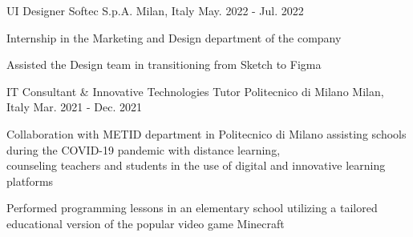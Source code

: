 \begin{cventries}
    \cventry
      {UI Designer} %
      {Softec S.p.A.} %
      {Milan, Italy} %
      {May. 2022 - Jul. 2022} %
      {
        \begin{cvitems} %
          {Internship in the Marketing and Design department of the company}
          \item {}
          \item {Assisted the Design team in transitioning from Sketch to Figma}
        \end{cvitems}
      }
  
    \cventry
      {IT Consultant \& Innovative Technologies Tutor} %
      {Politecnico di Milano} %
      {Milan, Italy} %
      {Mar. 2021 - Dec. 2021} %
      {
        \begin{cvitems} %
          {Collaboration with METID department in Politecnico di Milano assisting schools during the COVID-19 pandemic with distance learning, \\counseling teachers and students in the use of digital and innovative learning platforms}
          \item {}
          \item {Performed programming lessons in an elementary school utilizing a tailored educational version of the popular video game Minecraft}
        \end{cvitems}
      }
  
  \end{cventries}
